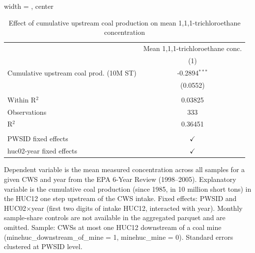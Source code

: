 
\begin{table}[htbp]
   
   \caption{\label{tab:6yr_huc02fe_1_1_1_trichloroethane_mean} Effect of cumulative upstream coal production on mean 1,1,1-trichloroethane concentration}
   \bigskip
   
   \centering
   
   \begin{adjustbox}{width = \textwidth, center}
      
      
      \begin{tabular}{lc}
         \toprule
         
                                                 & Mean 1,1,1-trichloroethane conc.\\  
         
                                                 & (1)\\  
         
         \midrule 
         Cumulative upstream coal prod. (10M ST) & -0.2894$^{***}$\\   
                                                 & (0.0552)\\   
         
          \\
         
         Within R$^2$                            & 0.03825\\  
         Observations                            & 333\\  
         R$^2$                                   & 0.36451\\  
         
          \\
         
         PWSID fixed effects                     & $\checkmark$\\   
         huc02-year fixed effects                & $\checkmark$\\   
         
         \bottomrule
         
      \end{tabular}
      
      
      
   \end{adjustbox}
      {\tiny\linespread{1}\selectfont \par \raggedright 
   Dependent variable is the mean measured concentration across all samples for a given CWS and year from the EPA 6-Year Review (1998--2005). Explanatory variable is the cumulative coal production (since 1985, in 10 million short tons) in the HUC12 one step upstream of the CWS intake. Fixed effects: PWSID and HUC02$\times$year (first two digits of intake HUC12, interacted with year). Monthly sample-share controls are not available in the aggregated parquet and are omitted. Sample: CWSs at most one HUC12 downstream of a coal mine (minehuc\_downstream\_of\_mine = 1, minehuc\_mine = 0). Standard errors clustered at PWSID level.}
   
\end{table}


